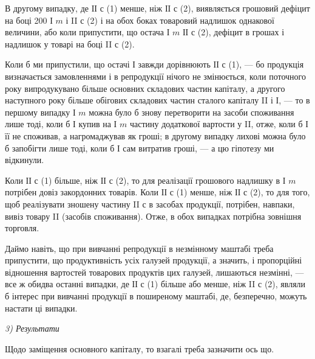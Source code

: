 В другому випадку, де ІІ $с$ (1) менше, ніж ІІ $с$ (2), виявляється грошовий
дефіцит на боці 200 І $m$ і II $с$ (2) і на обох боках товаровий надлишок
однакової величини, або коли припустити, що остача І $m$ \deq{} ІІ $с$ (2), дефіцит
в грошах і надлишок у товарі на боці II $с$ (2).

Коли б ми припустили, що остачі І завжди дорівнюють ІІ $с$ (1), — бо
продукція визначається замовленнями і в репродукції нічого не змінюється,
коли поточного року випродукувано більше основних складових частин
капіталу, а другого наступного року більше обігових складових частин
сталого капіталу II і І, — то в першому випадку І $m$ можна було б знову
перетворити на засоби споживання лише тоді, коли б І купив на І $m$
частину додаткової вартости у II, отже, коли б І її не споживав, а нагромаджував
як гроші; в другому випадку лихові можна було б запобігти
лише тоді, коли б І сам витратив гроші, — а цю гіпотезу ми
відкинули.

Коли ІІ $с$ (1) більше, ніж ІІ $с$ (2), то для реалізації грошового надлишку
в І $m$ потрібен довіз закордонних товарів. Коли ІІ $с$ (1) менше, ніж ІІ $с$
(2), то для того, щоб реалізувати зношену частину II $с$ в засобах продукції,
потрібен, навпаки, вивіз товару II (засобів споживання). Отже, в
обох випадках потрібна зовнішня торговля.

Даймо навіть, що при вивчанні репродукції в незмінному маштабі
треба припустити, що продуктивність усіх галузей продукції, а значить,
і пропорційні відношення вартостей товарових продуктів цих галузей,
лишаються незмінні, — все ж обидва останні випадки, де ІІ $с$ (1) більше
або менше, ніж II $с$ (2), являли б інтерес при вивчанні продукції в поширеному
маштабі, де, безперечно, можуть настати ці випадки.

\begin{center}
  \emph{3) Результати}
\end{center}

Щодо заміщення основного капіталу, то взагалі треба зазначити ось що.

